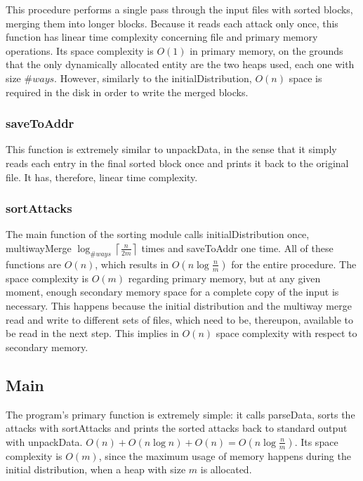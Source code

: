 \documentclass[10pt,a4paper]{article}
\numberwithin{equation}{section}
\begin{document}
This procedure performs a single pass through the input files with sorted blocks, merging them into longer blocks. Because it reads each attack only once, this function has linear time complexity concerning file and primary memory operations. Its space complexity is $O(1)$ in primary memory, on the grounds that the only dynamically allocated entity are the two heaps used, each one with size $\#ways$. However, similarly to the initialDistribution, $O(n)$ space is required in the disk in order to write the merged blocks.

\subsubsection{saveToAddr}

This function is extremely similar to unpackData, in the sense that it simply reads each entry in the final sorted block once and prints it back to the original file. It has, therefore, linear time complexity.

\subsubsection{sortAttacks}

The main function of the sorting module calls initialDistribution once, multiwayMerge $\log_{\#ways} \left \lceil{\frac{n}{2m}}\right \rceil$ times and saveToAddr one time. All of these functions are $O(n)$, which results in $O(n\log{\frac{n}{m}})$ for the entire procedure. The space complexity is $O(m)$ regarding primary memory, but at any given moment, enough secondary memory space for a complete copy of the input is necessary. This happens because the initial distribution and the multiway merge read and write to different sets of files, which need to be, thereupon, available to be read in the next step. This implies in $O(n)$ space complexity with respect to secondary memory.

\subsection{Main}

The program's primary function is extremely simple: it calls parseData, sorts the attacks with sortAttacks and prints the sorted attacks back to standard output with unpackData. $O(n) + O(n\log{n}) + O(n) = O(n\log{\frac{n}{m}})$. Its space complexity is $O(m)$, since the maximum usage of memory happens during the initial distribution, when a heap with size $m$ is allocated.
\end{document}
